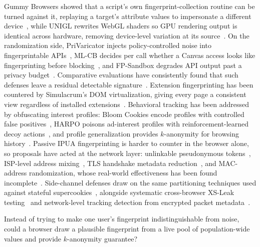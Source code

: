 %
Gummy Browsers showed that a script's own fingerprint-collection routine can be turned against it, replaying a target's attribute values to impersonate a different device~\cite{liuGummyBrowsersTargeted2022}, while UNIGL rewrites WebGL shaders so GPU rendering output is identical across hardware, removing device-level variation at its source~\cite{wuRenderedPrivateMaking2019}.
%
On the randomization side, PriVaricator injects policy-controlled noise into fingerprintable APIs~\cite{nikiforakisPriVaricatorDeceivingFingerprinters2015}, ML-CB decides per call whether a Canvas access looks like fingerprinting before blocking~\cite{reitingerMLCBMachineLearning2021}, and FP-Sandbox degrades API output past a privacy budget~\cite{torokOnlyPayWhat2023}.
%
Comparative evaluations have consistently found that such defenses leave a residual detectable signature~\cite{dattaEvaluatingAntiFingerprintingPrivacy2019}.
% 
Extension fingerprinting has been countered by Simulacrum's DOM virtualization, giving every page a consistent view regardless of installed extensions~\cite{karamiUnleashSimulacrumShifting2022}.
Behavioral tracking has been addressed by obfuscating interest profiles: Bloom Cookies encode profiles with controlled false positives~\cite{morBloomCookiesWeb2015}, HARPO poisons ad-interest profiles with reinforcement-learned decoy actions~\cite{zhangHARPOLearningSubvert2022}, and profile generalization provides $k$-anonymity for browsing history~\cite{zhuAnonymizingUserProfiles2010,zhengWebUserDeidentification2008}.
%
Passive IPUA fingerprinting is harder to counter in the browser alone, so proposals have acted at the network layer: unlinkable pseudonymous tokens~\cite{johnsonNymbleAnonymousIPAddress2007}, ISP-level address mixing~\cite{raghavanEnlistingISPsImprove2009}, TLS handshake metadata reduction~\cite{syEnhancedPerformancePrivacy2020}, and MAC-address randomization, whose real-world effectiveness has been found incomplete~\cite{fenskeThreeYearsLater2021}.
%
Side-channel defenses draw on the same partitioning techniques used against stateful supercookies~\cite{jacksonProtectingBrowserState2006}, alongside systematic cross-browser XS-Leak testing~\cite{knittelXSinatorcomFormalModel2021} and network-level tracking detection from encrypted packet metadata~\cite{leeNettrackGenericWeb2023}.


%
\begin{opbox}
Instead of trying to make one user's fingerprint indistinguishable from noise, could a browser draw a plausible fingerprint from a live pool of population-wide values and provide $k$-anonymity guarantee?
\end{opbox}


